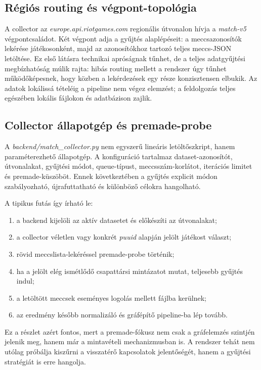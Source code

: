 \subsection{Régiós routing és végpont-topológia}

A collector az \textit{europe.api.riotgames.com} regionális útvonalon hívja a \textit{match-v5} végpontcsaládot. Két végpont adja a gyűjtés alaplépéseit: a meccsazonosítók lekérése játékosonként, majd az azonosítókhoz tartozó teljes meccs-JSON letöltése. Ez első látásra technikai apróságnak tűnhet, de a teljes adatgyűjtési megbízhatóság múlik rajta: hibás routing mellett a rendszer úgy tűnhet működőképesnek, hogy közben a lekérdezések egy része konzisztensen elbukik. Az adatok lokálissá tételéig a pipeline nem végez elemzést; a feldolgozás teljes egészében lokális fájlokon és adatbázison zajlik.

\subsection{Collector állapotgép és premade-probe}

A \textit{backend/match\_collector.py} nem egyszerű lineáris letöltőszkript, hanem paraméterezhető állapotgép. A konfiguráció tartalmaz dataset-azonosítót, útvonalakat, gyűjtési módot, queue-típust, meccsszám-korlátot, iterációs limitet és premade-küszöböt. Ennek következtében a gyűjtés explicit módon szabályozható, újrafuttatható és különböző célokra hangolható.

A tipikus futás így írható le:

\begin{enumerate}
    \item a backend kijelöli az aktív datasetet és előkészíti az útvonalakat;
    \item a collector véletlen vagy konkrét \textit{puuid} alapján jelölt játékost választ;
    \item rövid meccslista-lekéréssel premade-probe történik;
    \item ha a jelölt elég ismétlődő csapattársi mintázatot mutat, teljesebb gyűjtés indul;
    \item a letöltött meccsek eseményes logolás mellett fájlba kerülnek;
    \item az eredmény később normalizáló és gráfépítő pipeline-ba lép tovább.
\end{enumerate}

Ez a részlet azért fontos, mert a premade-fókusz nem csak a gráfelemzés szintjén jelenik meg, hanem már a mintavételi mechanizmusban is. A rendszer tehát nem utólag próbálja kiszűrni a visszatérő kapcsolatok jelentőségét, hanem a gyűjtési stratégiát is erre hangolja.

